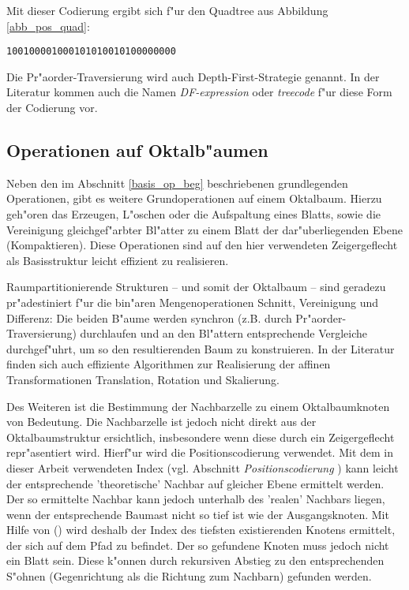 Mit dieser Codierung ergibt sich f"ur den Quadtree aus Abbildung 
\ref{abb_pos_quad}:
\begin{alltt}
1001000 01000101 01001010 0000000
\end{alltt}

Die Pr"aorder-Traversierung wird auch Depth-First-Strategie genannt. In der 
Literatur kommen auch die Namen \emph{DF-expression} oder \emph{treecode} f"ur 
diese Form der Codierung vor.

\subsection{Operationen auf Oktalb"aumen}
Neben den im Abschnitt \ref{basis_op_beg} beschriebenen grundlegenden 
Operationen, gibt es weitere Grundoperationen auf einem Oktalbaum.
Hierzu geh"oren das Erzeugen, L"oschen oder die Aufspaltung eines Blatts, 
sowie die Vereinigung gleichgef"arbter Bl"atter zu einem Blatt der 
dar"uberliegenden Ebene (Kompaktieren). Diese Operationen sind auf den hier 
verwendeten Zeigergeflecht als Basisstruktur leicht effizient zu realisieren. 

Raumpartitionierende Strukturen -- und somit der Oktalbaum -- sind geradezu 
pr"adestiniert f"ur die bin"aren Mengenoperationen Schnitt, Vereinigung 
und Differenz: Die beiden B"aume werden synchron (z.B. durch 
Pr"aorder-Traversierung) durchlaufen und an den Bl"attern entsprechende 
Vergleiche durchgef"uhrt, um so den resultierenden Baum zu konstruieren. 
In der Literatur finden sich auch effiziente Algorithmen zur Realisierung der 
affinen Transformationen Translation, Rotation und Skalierung. 

Des Weiteren ist die Bestimmung der Nachbarzelle zu einem Oktalbaumknoten 
von Bedeutung. 
Die Nachbarzelle ist jedoch nicht direkt aus der Oktalbaumstruktur ersichtlich, 
insbesondere wenn diese durch ein Zeigergeflecht repr"asentiert wird. Hierf"ur 
wird die Positionscodierung verwendet. Mit dem in dieser Arbeit verwendeten 
Index (vgl. Abschnitt \emph{Positionscodierung} ) kann 
leicht der entsprechende 'theoretische' Nachbar auf gleicher Ebene ermittelt 
werden. Der so ermittelte Nachbar kann jedoch unterhalb des 'realen' Nachbars 
liegen, wenn der entsprechende Baumast nicht so tief ist wie der 
Ausgangsknoten. 
Mit Hilfe von  
() wird deshalb der Index des tiefsten 
existierenden Knotens ermittelt, der sich auf dem Pfad zu  befindet. 
Der so gefundene Knoten muss jedoch nicht ein Blatt sein. Diese k"onnen durch 
rekursiven Abstieg zu den entsprechenden S"ohnen (Gegenrichtung als die 
Richtung zum Nachbarn) gefunden werden.

